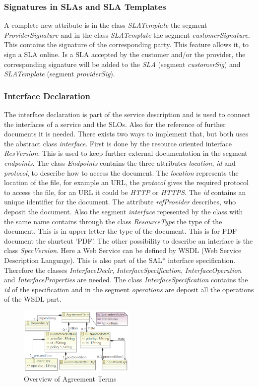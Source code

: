 \subsubsection{Signatures in SLAs and SLA Templates}
A complete new attribute is in the class {\it SLATemplate} the segment {\it ProviderSignature} and in the class  {\it SLATemplate} the segment {\it customerSignature}. This contains the signature of the corresponding party. This feature allows it, to sign a SLA online. Is a SLA accepted by the customer and/or the provider, the corresponding signature will be added to the {\it SLA} (segment {\it customerSig}) and {\it SLATemplate} (segment {\it providerSig}).

\subsubsection{Interface Declaration}
The interface declaration is part of the service description and is used to connect the interfaces of a service and the SLOs. Also for the reference of further documents it is needed. There exists two ways to implement that, but both uses the abstract class {\it interface}. First is done by the resource oriented
interface {\it ResVersion}. This is used to keep further external documentation in the segment {\it endpoints}. The class {\it Endpoints} contains the three attributes {\it location}, {\it id} and {\it protocol}, to describe how to access the document. The {\it location} represents the location of the file, for example an URL, the {\it protocol} gives the required protocol to access the file, for an URL it could be {\it HTTP} or {\it HTTPS}. The {\it id} contains an unique identifier for the document. The attribute {\it refProvider} describes, who deposit the document. Also the segment {\it interface} repesented by the class with the same name contains through the class {\it ResourceType} the type of the document. This is in upper letter the type of the document. This is for PDF document the shurtcut 'PDF'.
The other possibility to describe an interface is the class {\it SpecVersion}. Here a Web Service can be defined by WSDL (Web Service Description Language). This is also part of the SAL* interface specification. Therefore the classes {\it InterfaceDeclr}, {\it InterfaceSpecification}, {\it InterfaceOperation} and {\it InterfaceProperties} are needed. The class {\it InterfaceSpecification} contains the {\it id} of the specification and in the segment {\it operations} are deposit all the operations of the WSDL part.
\begin{figure}[ht]
		\centering
\includegraphics[width=0.5\textwidth]{fig/sloa_agreement_term.png}
\caption{Overview of Agreement Terms}
\label{fig:overview_AT}
\end{figure}

